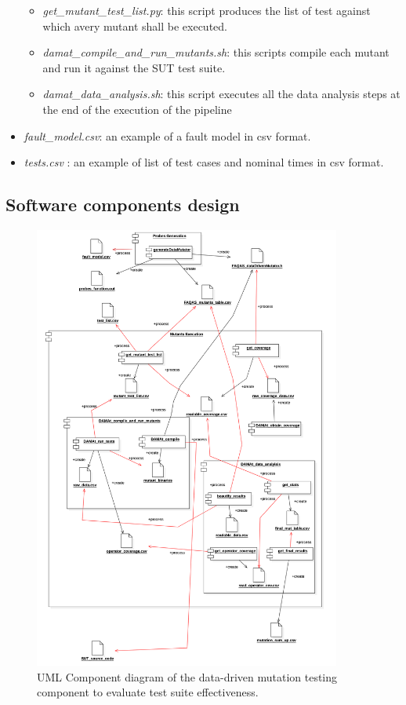\begin{itemize}
\begin{itemize}
		\item \textit{get\_mutant\_test\_list.py}: this script produces the list of test against which avery mutant shall be executed.
	  \item \textit{damat\_compile\_and\_run\_mutants.sh}: this scripts compile each mutant and run it against the SUT test suite.
		\item \textit{damat\_data\_analysis.sh}: this script executes all the data analysis steps at the end of the execution of the \dama pipeline
	\end{itemize}
	\item \textit{fault\_model.csv}: an example of a \dama fault model in csv format.
 	\item \textit{tests.csv }: an example of list of test cases and nominal times in csv format.
\end{itemize}
\clearpage

\subsection{Software components design}
\label{sec:damat_component:design}

\begin{figure}[tb]
  \centering
	\includegraphics[width=0.9\textwidth]{images/damat_components.png}
      \caption{UML Component diagram of the data-driven mutation testing component to evaluate test suite effectiveness.}
      \label{fig:damat_component_diagram}
\end{figure}

